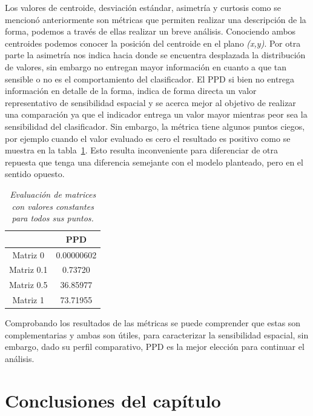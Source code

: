Los valores de centroide, desviación estándar, asimetría y curtosis como se mencionó anteriormente son métricas que permiten realizar una descripción de la forma, podemos a través de ellas realizar un breve análisis. Conociendo ambos centroides podemos conocer la posición del centroide en el plano \textit{(x,y)}. Por otra parte la asimetría nos indica hacia donde se encuentra desplazada la distribución de valores, sin embargo no entregan mayor información en cuanto a que tan sensible o no es el comportamiento del clasificador. El PPD si bien no entrega información en detalle de la forma, indica de forma directa un valor representativo de sensibilidad espacial y se acerca mejor al objetivo de realizar una comparación ya que el indicador entrega un valor mayor mientras peor sea la sensibilidad del clasificador. Sin embargo, la métrica tiene algunos puntos ciegos, por ejemplo cuando el valor evaluado es cero el resultado es positivo  como se muestra en la tabla~\ref{tab:planas}. Esto resulta inconveniente para diferenciar de otra repuesta que tenga una diferencia semejante con el modelo planteado, pero en el sentido opuesto.

\begin{table}[h]
\centering
  \caption{\em Evaluación de matrices con valores constantes para todos sus puntos. }   \label{tab:planas}
\begin{tabular}{c|c|}
\cline{2-2}
                                 & PPD    \\ \hline
\multicolumn{1}{|c|}{Matriz 0}   &  0.00000602 \\ \hline
\multicolumn{1}{|c|}{Matriz 0.1} &  0.73720 \\ \hline
\multicolumn{1}{|c|}{Matriz 0.5}  & 36.85977 \\ \hline
\multicolumn{1}{|c|}{Matriz 1}  &  73.71955 \\ \hline
\end{tabular}
\end{table}

Comprobando los resultados de las métricas se puede comprender que estas son complementarias y ambas son útiles, para caracterizar la sensibilidad espacial, sin embargo, dado su perfil comparativo, PPD es la mejor elección para continuar el análisis.

\section{Conclusiones del capítulo}
\label{metricas:conclusiones}

